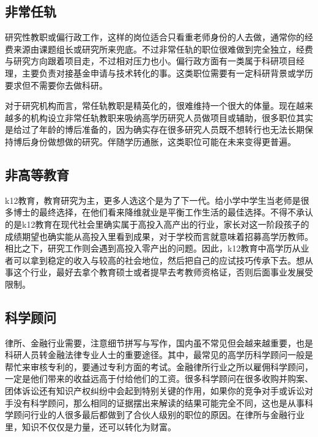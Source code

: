 \documentclass[]{tufte-book}
\begin{document}
\hypertarget{ux975eux5e38ux4efbux8f68}{%
\subsection{非常任轨}\label{ux975eux5e38ux4efbux8f68}}

研究性教职或偏行政工作，这样的岗位适合只看重老师身份的人去做，通常你的经费来源由课题组长或研究所来兜底。不过非常任轨的职位很难做到完全独立，经费与研究方向跟着项目走，不过相对压力也小。偏行政方面有一类属于科研项目经理，主要负责对接基金申请与技术转化的事。这类职位需要有一定科研背景或学历要求但不需要你去做科研。

对于研究机构而言，常任轨教职是精英化的，很难维持一个很大的体量。现在越来越多的机构设立非常任轨教职来吸纳高学历研究人员做项目或辅助，很多职位其实是给过了年龄的博后准备的，因为确实存在很多研究人员既不想转行也无法长期保持博后身份做想做的研究。伴随学历通胀，这类职位可能在未来变得更普遍。

\hypertarget{ux975eux9ad8ux7b49ux6559ux80b2}{%
\subsection{非高等教育}\label{ux975eux9ad8ux7b49ux6559ux80b2}}

k12教育，教育研究为主，更多人选这个是为了下一代。给小学中学生当老师是很多博士的最终选择，在他们看来降维就业是平衡工作生活的最佳选择。不得不承认的是k12教育在现代社会里确实属于高投入高产出的行业，家长对这一阶段孩子的成绩期望也确实能从高投入里看到成果，对于学校而言就意味着招募高学历教师。相比之下，研究工作则会遇到高投入零产出的问题。因此，k12教育中高学历从业者可以拿到稳定的收入与较高的社会地位，然后把自己的应试技巧传承下去。想从事这个行业，最好去拿个教育硕士或者提早去考教师资格证，否则后面事业发展受限制。

\hypertarget{ux79d1ux5b66ux987eux95ee}{%
\subsection{科学顾问}\label{ux79d1ux5b66ux987eux95ee}}

律所、金融行业需要，注意细节拼写与写作，国内虽不常见但会越来越重要，也是科研人员转金融法律专业人士的重要途径。其中，最常见的高学历科学顾问一般是帮忙来审核专利的，要通过专利方面的考试。金融律所行业之所以雇佣科学顾问，一定是他们带来的收益远高于付给他们的工资。很多科学顾问在很多收购并购案、团体诉讼还有知识产权纠纷中会起到特别关键的作用，如果你的竞争对手或诉讼对手没有科学顾问，那么相同的证据摆出来解读的结果可能完全不同，这也是从事科学顾问行业的人很多最后都做到了合伙人级别的职位的原因。在律所与金融行业里，知识不仅仅是力量，还可以转化为财富。
\end{document}
